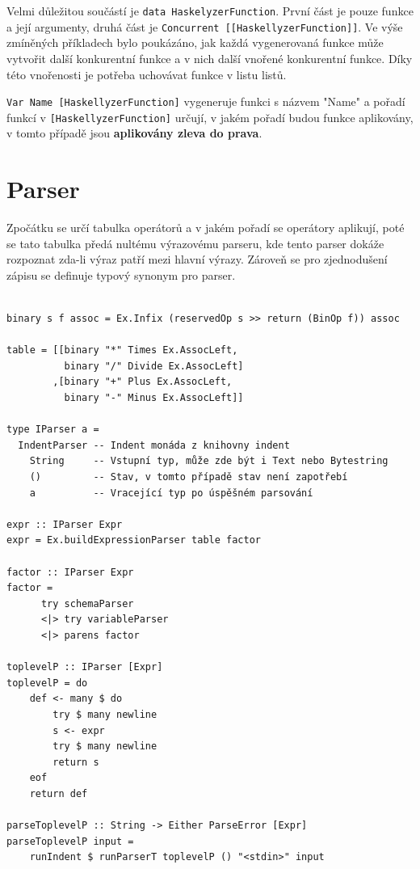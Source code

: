 \documentclass[male,czech]{kithesis}
\newcommand{\haskellInline}[1]{\colorbox{gray!10}{\texttt{#1}}}
\begin{document}
Velmi důležitou součástí je \haskellInline{data HaskelyzerFunction}. První část je pouze 
funkce a její argumenty, druhá část je \haskellInline{Concurrent [[HaskellyzerFunction]]}.
Ve výše zmíněných příkladech bylo poukázáno, jak každá vygenerovaná funkce může vytvořit 
další konkurentní funkce a v nich další vnořené konkurentní funkce. Díky této vnořenosti 
je potřeba uchovávat funkce v listu listů.

\haskellInline{Var Name [HaskellyzerFunction]} vygeneruje funkci s názvem "Name" a pořadí 
funkcí v \haskellInline{[HaskellyzerFunction]} určují, v jakém pořadí budou funkce aplikovány,
v tomto případě jsou \textbf{aplikovány zleva do prava}.


\section{Parser}

Zpočátku se určí tabulka operátorů a v jakém pořadí se operátory 
aplikují, poté se tato tabulka předá nultému výrazovému parseru, kde 
tento parser dokáže rozpoznat zda-li výraz  patří mezi
hlavní výrazy. Zároveň se pro zjednodušení zápisu se definuje typový 
synonym pro parser.

\begin{verbatim}

binary s f assoc = Ex.Infix (reservedOp s >> return (BinOp f)) assoc

table = [[binary "*" Times Ex.AssocLeft,
          binary "/" Divide Ex.AssocLeft]
        ,[binary "+" Plus Ex.AssocLeft,
          binary "-" Minus Ex.AssocLeft]]

type IParser a = 
  IndentParser -- Indent monáda z knihovny indent
    String     -- Vstupní typ, může zde být i Text nebo Bytestring
    ()         -- Stav, v tomto případě stav není zapotřebí
    a          -- Vracející typ po úspěšném parsování

expr :: IParser Expr
expr = Ex.buildExpressionParser table factor

factor :: IParser Expr
factor = 
      try schemaParser 
      <|> try variableParser
      <|> parens factor 

toplevelP :: IParser [Expr]
toplevelP = do 
    def <- many $ do 
        try $ many newline
        s <- expr 
        try $ many newline
        return s
    eof
    return def

parseToplevelP :: String -> Either ParseError [Expr]
parseToplevelP input = 
    runIndent $ runParserT toplevelP () "<stdin>" input

\end{verbatim}
\end{document}
